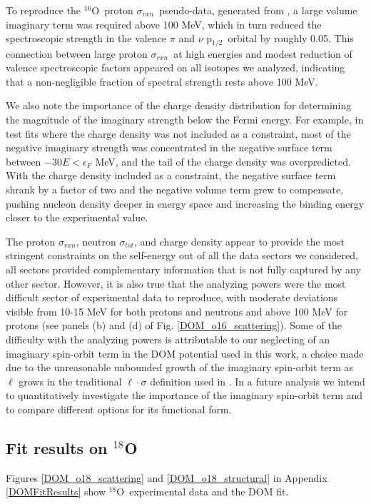 \documentclass[twocolumn,secnumarabic,amssymb, nobibnotes, aps, prl,
superscriptaddress, nobalancelastpage]{revtex4}
\newcommand{\tot}{\ensuremath{\sigma_{tot}}}
\newcommand{\rxn}{\ensuremath{\sigma_{rxn}}}
\newcommand{\oSix}{\ensuremath{^{16}}O}
\newcommand{\oEight}{\ensuremath{^{18}}O}
\newcommand{\pOne}{p\ensuremath{_{1/2}}}
\begin{document}
To reproduce the \oSix\ proton \rxn\
pseudo-data, generated from \cite{Carlson1975}, a large volume imaginary term
was required above 100 MeV, which in turn reduced the spectroscopic strength in
the valence $\pi$ and $\nu$ \pOne\ orbital by roughly 0.05. This connection
between large proton \rxn\ at high energies and modest reduction of valence
spectroscopic factors appeared on all isotopes we analyzed, indicating that a
non-negligible fraction of spectral strength rests above 100 MeV.

We also note the importance of the charge density distribution for determining the 
magnitude of the imaginary strength below the Fermi energy. For example, in test
fits where the charge density was not included as a constraint, most of the
negative imaginary strength was concentrated in the negative surface term
between $-30 E < \epsilon_{F}$ MeV, and the tail of the charge density was
overpredicted. With the charge density included as a constraint,
the negative surface term shrank by a factor of two and the negative volume term
grew to compensate, pushing nucleon density deeper in energy space and
increasing the binding energy closer to the experimental value.

The proton \rxn, neutron \tot, and charge density appear to provide the most
stringent constraints on the self-energy out of all the data sectors we
considered, all sectors provided complementary information that is not fully
captured by any other sector. However, it is also true that the analyzing powers
were the most difficult sector of experimental data to
reproduce, with moderate deviations visible from 10-15 MeV for both protons and
neutrons and above 100 MeV for protons (see panels (b) and (d) of
Fig. \ref{DOM_o16_scattering}). Some
of the difficulty with the analyzing powers is attributable to our neglecting of
an imaginary spin-orbit term in the DOM potential used in this work, a choice
made due to the unreasonable unbounded growth of the imaginary spin-orbit term
as $\ell$ grows in the traditional $\ell\cdot\sigma$ definition used in
\cite{KoningDelaroche}. In a future analysis we intend to quantitatively
investigate the importance of the imaginary spin-orbit term and to compare
different options for its functional form.

\subsection{Fit results on $^{18}$O}
Figures \ref{DOM_o18_scattering} and \ref{DOM_o18_structural} in Appendix
\ref{DOMFitResults} show \oEight\ experimental data and the DOM fit.
\end{document}
